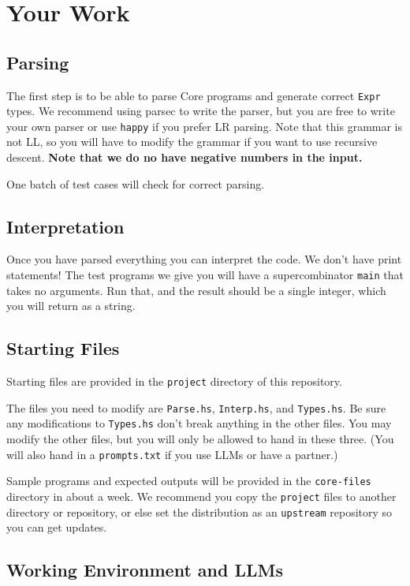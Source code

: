 \documentclass[11pt]{article}
\begin{document}
\section{Your Work}
\label{sec:org27ed090}

\subsection{Parsing}
\label{sec:orgce43c65}

The first step is to be able to parse Core programs and generate correct \texttt{Expr} types.  We recommend using parsec to write the parser,
but you are free to write your own parser or use \texttt{happy} if you prefer LR parsing.  Note that this grammar is not LL, so you will have to
modify the grammar if you want to use recursive descent.  \textbf{Note that we do no have negative numbers in the input.}

One batch of test cases will check for correct parsing.
\subsection{Interpretation}
\label{sec:orgae9bbd2}

Once you have parsed everything you can interpret the code.  We don't have print statements!  The test programs we give you will have a
supercombinator \texttt{main} that takes no arguments.  Run that, and the result should be a single integer, which you will return as a string.
\subsection{Starting Files}
\label{sec:orga11692f}

Starting files are provided in the \texttt{project} directory of this repository.

The files you need to modify are \texttt{Parse.hs}, \texttt{Interp.hs}, and \texttt{Types.hs}.  Be sure any modifications to \texttt{Types.hs} don't break anything
in the other files.  You may modify the other files, but you will only be allowed to hand in these three.  (You will also hand in a
\texttt{prompts.txt} if you use LLMs or have a partner.)

Sample programs and expected outputs will be provided in the \texttt{core-files} directory in about a week.  We recommend you copy the \texttt{project} files
to another directory or repository, or else set the distribution as an \texttt{upstream} repository so you can get updates.
\subsection{Working Environment and LLMs}
\label{sec:orgbec74ca}
\end{document}
